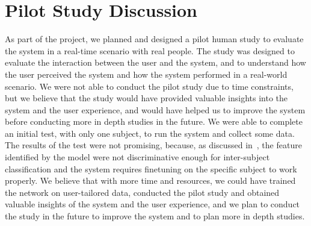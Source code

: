 \section{Pilot Study Discussion}
As part of the project, we planned and designed a pilot human study to evaluate the system in a real-time scenario with real people.
The study was designed to evaluate the interaction between the user and the system, and to understand how the user perceived the system and how the system performed in a real-world scenario.
We were not able to conduct the pilot study due to time constraints, but we believe that the study would have provided valuable insights into the system and the user experience, and would have helped us to improve the system before conducting more in depth studies in the future.
We were able to complete an initial test, with only one subject, to run the system and collect some data.
The results of the test were not promising, because, as discussed in~\cite{jia2023excellent}, the feature identified by the model were not discriminative enough for inter-subject classification and the system requires finetuning on the specific subject to work properly.
We believe that with more time and resources, we could have trained the network on user-tailored data, conducted the pilot study and obtained valuable insights of the system and the user experience, and we plan to conduct the study in the future to improve the system and to plan more in depth studies.